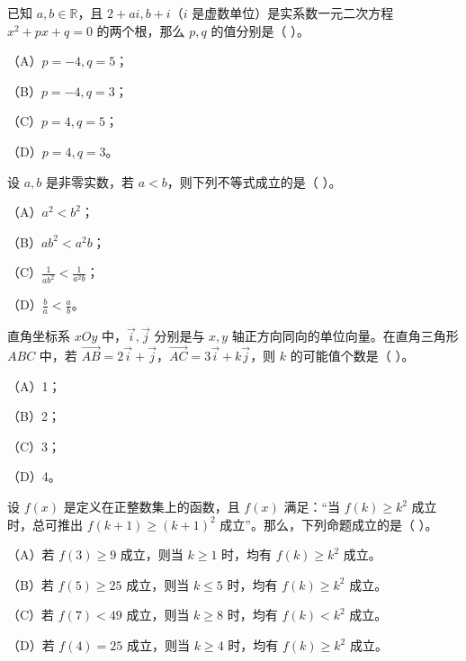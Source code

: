 \begin{question}
已知 $a,b\in\mathbb R$，且 $2+ai,b+i$（$i$ 是虚数单位）是实系数一元二次方程 $x^2+px+q=0$ 的两个根，那么 $p,q$ 的值分别是（ ）。

（A）$p=-4,q=5$；

（B）$p=-4,q=3$；

（C）$p=4,q=5$；

（D）$p=4,q=3$。
\end{question}
\begin{question}
设 $a,b$ 是非零实数，若 $a<b$，则下列不等式成立的是（ ）。

（A）$a^2<b^2$；

（B）$ab^2<a^2b$；

（C）$\frac1{ab^2}<\frac1{a^2b}$；

（D）$\frac ba<\frac ab$。
\end{question}
\begin{question}
直角坐标系 $xOy$ 中，$\vec i,\vec j$ 分别是与 $x,y$ 轴正方向同向的单位向量。在直角三角形 $ABC$ 中，若 $\overrightarrow{AB}=2\vec i+\vec j$，$\overrightarrow{AC}=3\vec i+k\vec j$，则 $k$ 的可能值个数是（ ）。

（A）1；

（B）2；

（C）3；

（D）4。
\end{question}
\begin{question}
设 $f(x)$ 是定义在正整数集上的函数，且 $f(x)$ 满足：“当 $f(k)\ge k^2$ 成立时，总可推出 $f(k+1)\ge(k+1)^2$ 成立”。那么，下列命题成立的是（ ）。

（A）若 $f(3)\ge9$ 成立，则当 $k\ge1$ 时，均有 $f(k)\ge k^2$ 成立。

（B）若 $f(5)\ge25$ 成立，则当 $k\le5$ 时，均有 $f(k)\ge k^2$ 成立。

（C）若 $f(7)<49$ 成立，则当 $k\ge8$ 时，均有 $f(k)<k^2$ 成立。

（D）若 $f(4)=25$ 成立，则当 $k\ge4$ 时，均有 $f(k)\ge k^2$ 成立。

\end{question}

